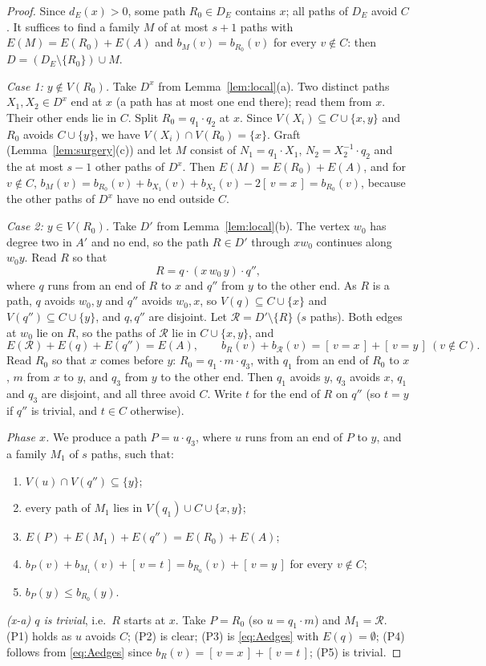 \documentclass[11pt]{amsart}
\theoremstyle{definition}
\theoremstyle{remark}
\renewcommand{\_}{\oldunderscore\allowbreak}
\newcommand{\ind}[1]{[\,#1\,]}
\begin{document}
\begin{proof}
Since $d_E(x)>0$, some path $R_0\in D_E$ contains $x$; all paths of $D_E$ avoid $C$. It suffices to
find a family $M$ of at most $s+1$ paths with $E(M)=E(R_0)+E(A)$ and $b_M(v)=b_{R_0}(v)$ for every
$v\notin C$: then $D=(D_E\setminus\{R_0\})\cup M$.

\emph{Case 1: $y\notin V(R_0)$.} Take $D^x$ from Lemma~\ref{lem:local}(a). Two distinct paths
$X_1,X_2\in D^x$ end at $x$ (a path has at most one end there); read them from $x$. Their other ends
lie in $C$. Split $R_0=q_1\cdot q_2$ at $x$. Since $V(X_i)\subseteq C\cup\{x,y\}$ and $R_0$ avoids
$C\cup\{y\}$, we have $V(X_i)\cap V(R_0)=\{x\}$. Graft (Lemma~\ref{lem:surgery}(c)) and let $M$
consist of $N_1=q_1\cdot X_1$, $N_2=X_2^{-1}\cdot q_2$ and the at most $s-1$ other paths of $D^x$.
Then $E(M)=E(R_0)+E(A)$, and for $v\notin C$,
$b_M(v)=b_{R_0}(v)+b_{X_1}(v)+b_{X_2}(v)-2\ind{v=x}=b_{R_0}(v)$, because the other paths of $D^x$
have no end outside $C$.

\emph{Case 2: $y\in V(R_0)$.} Take $D'$ from Lemma~\ref{lem:local}(b). The vertex $w_0$ has degree
two in $A'$ and no end, so the path $R\in D'$ through $xw_0$ continues along $w_0y$. Read $R$ so that
\[
R=q\cdot(x\,w_0\,y)\cdot q'',
\]
where $q$ runs from an end of $R$ to $x$ and $q''$ from $y$ to the other end. As $R$ is a path, $q$
avoids $w_0,y$ and $q''$ avoids $w_0,x$, so $V(q)\subseteq C\cup\{x\}$ and $V(q'')\subseteq C\cup\{y\}$,
and $q,q''$ are disjoint. Let $\mathcal R=D'\setminus\{R\}$ ($s$ paths). Both edges at $w_0$ lie on
$R$, so the paths of $\mathcal R$ lie in $C\cup\{x,y\}$, and
\begin{equation}\label{eq:Aedges}
E(\mathcal R)+E(q)+E(q'')=E(A),\qquad b_R(v)+b_{\mathcal R}(v)=\ind{v=x}+\ind{v=y}\ (v\notin C).
\end{equation}
Read $R_0$ so that $x$ comes before $y$: $R_0=q_1\cdot m\cdot q_3$, with $q_1$ from an end of $R_0$ to
$x$, $m$ from $x$ to $y$, and $q_3$ from $y$ to the other end. Then $q_1$ avoids $y$, $q_3$ avoids
$x$, $q_1$ and $q_3$ are disjoint, and all three avoid $C$. Write $t$ for the end of $R$ on $q''$
(so $t=y$ if $q''$ is trivial, and $t\in C$ otherwise).

\emph{Phase $x$.} We produce a path $P=u\cdot q_3$, where $u$ runs from an end of $P$ to $y$, and a
family $M_1$ of $s$ paths, such that:
\begin{enumerate}[label=(P\arabic*),leftmargin=3em]
\item $V(u)\cap V(q'')\subseteq\{y\}$;
\item every path of $M_1$ lies in $V(q_1)\cup C\cup\{x,y\}$;
\item $E(P)+E(M_1)+E(q'')=E(R_0)+E(A)$;
\item $b_P(v)+b_{M_1}(v)+\ind{v=t}=b_{R_0}(v)+\ind{v=y}$ for every $v\notin C$;
\item $b_P(y)\le b_{R_0}(y)$.
\end{enumerate}
\emph{(x-a) $q$ is trivial}, i.e.\ $R$ starts at $x$. Take $P=R_0$ (so $u=q_1\cdot m$) and
$M_1=\mathcal R$. (P1) holds as $u$ avoids $C$; (P2) is clear; (P3) is \eqref{eq:Aedges} with
$E(q)=\emptyset$; (P4) follows from \eqref{eq:Aedges} since $b_R(v)=\ind{v=x}+\ind{v=t}$; (P5) is
trivial.


\end{proof}
\end{document}
